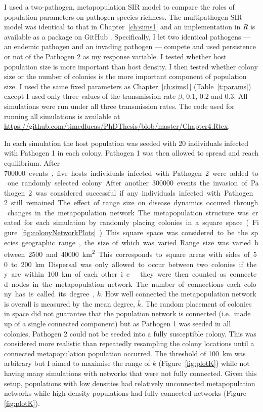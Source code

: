 I used a two-pathogen, metapopulation SIR model to compare the roles of population parameters on pathogen species richness.
The multipathogen SIR model was identical to that in Chapter~\ref{ch:sims1} and an implementation in \emph{R} \cite{R} is available as a package on GitHub \cite{metapopepi}.
Specifically, I let two identical pathogens --- an endemic pathogen and an invading pathogen --- compete and used persistence or not of the Pathogen 2 as my response variable.
I tested whether host population size is more important than host density.
I then tested whether colony size or the number of colonies is the more important component of population size.
I used the same fixed parameters as Chapter~\ref{ch:sims1} (Table~\ref{t:params}) except I used only three values of the transmission rate $\beta$,  0.1, 0.2 and 0.3.
All simulations were run under all three transmission rates.
The code used for running all simulations is available at \url{https://github.com/timcdlucas/PhDThesis/blob/master/Chapter4.Rtex}.

In each simulation the host population was seeded with 20 individuals infected with Pathogen 1 in each colony. 
Pathogen 1 was then allowed to spread and reach equilibrium. 
After \SI{700000} events, five hosts individuals infected with Pathogen 2 were added to one randomly selected colony. 
After another \SI{300000} events the invasion of Pathogen 2 was considered successful if any individuals infected  with Pathogen 2 still remained.

The effect of range size on disease dynamics occured through changes in the metapopulation network.
The metapopulation structure was created for each simulation by randomly placing colonies in a square space (Figure~\ref{fig:colonyNetworkPlots}).
This square space was considered to be the species geographic range, the size of which was varied.
Range size was varied between \SI{2500} and \SI{40000}{\square\kilo\metre}.
This corresponds to square areas with sides of 50 to \SI{200}{\kilo\metre}.
Dispersal was only allowed to occur between two colonies if they are within \SI{100}{\kilo\metre} of each other i.e.\ they were then counted as connected nodes in the metapopulation network.
The number of connections each colony has is called its degree, $k$.
How well connected the metapopulation network is overall is measured by the mean degree, $\bar{k}$.
The random placement of colonies in space did not guarantee that the population network is connected (i.e.\ made up of a single connected component) but as Pathogen 1 was seeded in all colonies, Pathogen 2 could not be seeded into a fully susceptible colony.
This was considered more realistic than repeatedly resampling the colony locations until a connected metapopulation population occurred.
The threshold of \SI{100}{\kilo\metre} was arbitrary but I aimed to maximise the range  of $\bar{k}$ (Figure~\ref{fig:plotK}) while not having many simulations with networks that were not fully connected.
Given this setup, populations with low densities had relatively unconnected metapopulation networks while high density populations had fully connected networks (Figure \ref{fig:plotK}).






